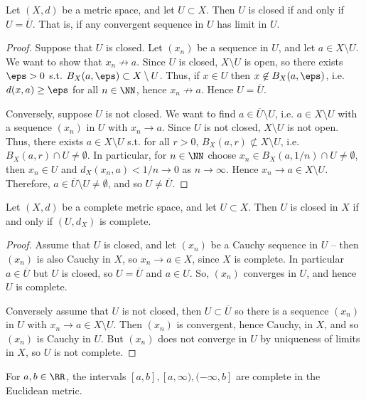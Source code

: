 \begin{proposition}
  Let $(X,d)$ be a metric space, and let $U\subset X$. Then $U$ is closed if and
  only if $U=\overline{U}$. That is, if  any convergent sequence in $U$ has
  limit in $U$.
  \label{<+label+>}
\end{proposition}
\begin{proof}
  Suppose that $U$ is closed. Let $(x_n)$ be a sequence in $U$, and let $a\in
  X\setminus U$. We want to show that $x_n\not\to a$. Since $U$ is closed,
  $X\setminus U$ is open, so there exists $\eps>0$ s.t. $B_X(a,\eps)\subset
  X\setminus U$. Thus, if $x\in U$ then $x\not\in B_X(a,\eps)$, i.e. $d(x,a)\geq
  \eps$ for all $n\in\NN$, hence $x_n\not\to a$. Hence $U=\overline{U}$.

  Conversely, suppose $U$ is not closed. We want to find
  $a\in\overline{U}\setminus U$, i.e. $a\in X\setminus U$ with a sequence
  $(x_n)$ in $U$ with $x_n\to a$. Since $U$ is not closed, $X\setminus U$ is not
  open. Thus, there exists $a\in X\setminus U$ s.t. for all $r>0$,
  $B_X(a,r)\not\subset X\setminus U$, i.e. $B_X(a,r)\cap U\neq \emptyset$. In
  particular, for $n\in\NN$ choose $x_n\in B_X(a,1/n)\cap U\neq \emptyset$,
  then $x_n\in U$ and $d_X(x_n,a)<1/n\to 0$ as $n\to\infty$. Hence $x_n\to a\in
  X\setminus U$. Therefore, $a\in \overline{U}\setminus U\neq \emptyset$, and so
  $U\neq \overline{U}$.
\end{proof}

\begin{proposition}
  Let $(X,d)$ be a complete metric space, and let $U\subset X$. Then $U$ is
  closed in $X$ if and only if $(U,d_X)$ is complete. 
  \label{<+label+>}
\end{proposition}
\begin{proof}
  Assume that $U$ is closed, and let $(x_n)$ be a Cauchy sequence in $U$ -- then
  $(x_n)$ is also Cauchy in $X$, so $x_n\to a\in X$, since $X$ is complete. In
  particular $a\in\overline{U}$ but $U$ is closed, so $U=\overline{U}$ and $a\in
  U$. So, $(x_n)$ converges in $U$, and hence $U$ is complete. 

  Conversely assume that $U$ is not closed, then $U\subset\overline{U}$ so there
  is a sequence $(x_n)$ in $U$ with $x_n\to a\in X\setminus U$. Then $(x_n)$ is
  convergent, hence Cauchy, in $X$, and so $(x_n)$ is Cauchy in $U$. But $(x_n)$
  does not converge in $U$ by uniqueness of limits in $X$, so $U$ is not
  complete.
\end{proof}

\begin{corollary}
  For $a,b\in\RR$, the intervals $[a,b],[a,\infty), (-\infty, b]$ are complete
  in the Euclidean metric.
  \label{<+label+>}
\end{corollary}

